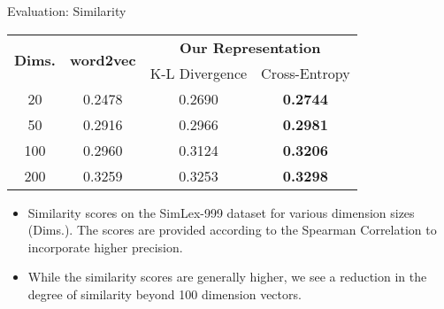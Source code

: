 \documentclass[8pt]{beamer}
\begin{document}
\begin{frame}{Evaluation: Similarity}

   \begin{tabular}{c|c|cc}
        \multirow{2}{*}{\bf Dims.}   & \multirow{2}{*}{\bf word2vec} & \multicolumn{2}{c}{\bf Our Representation} \\ \cline{3-4}
                            &                               & K-L Divergence & Cross-Entropy \\\hline
        20  &   0.2478   & 0.2690 & \bf 0.2744    \\
        50  &   0.2916   & 0.2966 & \bf 0.2981    \\
        100 &   0.2960   & 0.3124 & \bf 0.3206    \\
        200 &   0.3259   & 0.3253 & \bf 0.3298
    \end{tabular}

  \begin{itemize}
    \item Similarity scores on the SimLex-999 dataset for various dimension sizes (Dims.). The scores are provided according to the Spearman Correlation to incorporate higher precision.
    \item While the similarity scores are generally higher, we see a reduction in the degree of similarity beyond 100 dimension vectors. 
  \end{itemize}
\end{frame}
\end{document}
